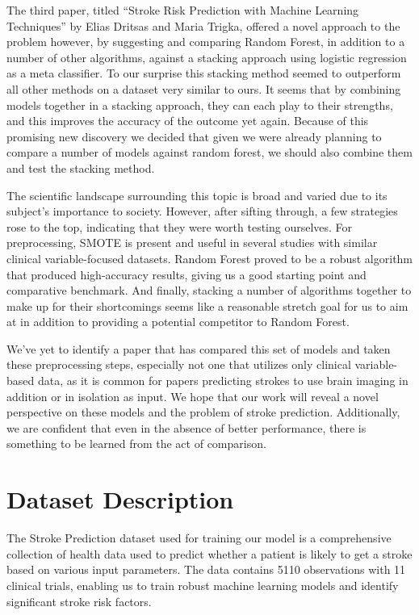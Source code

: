 \documentclass[11pt]{article}
\begin{document}
\medskip

The third paper, titled “Stroke Risk Prediction with Machine Learning Techniques” by Elias Dritsas and Maria Trigka, offered a novel approach to the problem however, by suggesting and comparing Random Forest, in addition to a number of other algorithms, against a stacking approach using logistic regression as a meta classifier. To our surprise this stacking method seemed to outperform all other methods on a dataset very similar to ours. It seems that by combining models together in a stacking approach, they can each play to their strengths, and this improves the accuracy of the outcome yet again. Because of this promising new discovery we decided that given we were already planning to compare a number of models against random forest, we should also combine them and test the stacking method.

\medskip
The scientific landscape surrounding this topic is broad and varied due to its subject's importance to society. However, after sifting through, a few strategies rose to the top, indicating that they were worth testing ourselves. For preprocessing, SMOTE is present and useful in several studies with similar clinical variable-focused datasets. Random Forest proved to be a robust algorithm that produced high-accuracy results, giving us a good starting point and comparative benchmark. And finally, stacking a number of algorithms together to make up for their shortcomings seems like a reasonable stretch goal for us to aim at in addition to providing a potential competitor to Random Forest. 

\medskip

We’ve yet to identify a paper that has compared this set of models and taken these preprocessing steps, especially not one that utilizes only clinical variable-based data, as it is common for papers predicting strokes to use brain imaging in addition or in isolation as input. We hope that our work will reveal a novel perspective on these models and the problem of stroke prediction. Additionally, we are confident that even in the absence of better performance, there is something to be learned from the act of comparison.

\section*{Dataset Description}
The Stroke Prediction dataset used for training our model is a comprehensive collection of health data used to predict whether a patient is likely to get a stroke based on various input parameters. The data contains 5110 observations with 11 clinical trials, enabling us to train robust machine learning models and identify significant stroke risk factors. 
\end{document}
